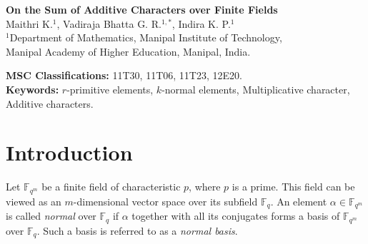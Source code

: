 \documentclass[12pt,a4paper]{article}
\date{}
\theoremstyle{plain}
\theoremstyle{definition}
\numberwithin{equation}{section}
\begin{document}
    \begin{center}
        {\LARGE \textbf{On the Sum of Additive Characters over Finite Fields}}\\
        {\small Maithri K.$^{1}$, Vadiraja Bhatta G. R.$^{1,*}$, Indira K. P.$^{1}$ \\
        $^{1}$Department of Mathematics, Manipal Institute of Technology, \\
        Manipal Academy of Higher Education, Manipal, India.}
    \end{center}
    \begin{abstract}
        In this paper, we study the sum of additive characters over finite fields, with a focus on those of specified $\mathbb{F}_q$-Order. We establish a general formula for these character sums, providing an additive analogue to classical results previously known for multiplicative characters. As an application, we derive a M\"obius function $\mu(g)$ for polynomials $g \in \mathbb{F}_q[x]$, analogous to the integer M\"obius function $\mu(n)$, and develop a characteristic function for $k$-normal elements. We also generalize several classical identities from the integer setting to the polynomial setting, highlighting the structural parallels between these two domains.
    \end{abstract}
    \textbf{MSC Classifications:} 11T30, 11T06, 11T23, 12E20.\\
    \textbf{Keywords:} $r$-primitive elements, $k$-normal elements, Multiplicative character, Additive characters.
    \section{Introduction}

    Let $\mathbb{F}_{q^m}$ be a finite field of characteristic $p$, where $p$ is a prime. This field can be viewed as an $m$-dimensional vector space over its subfield $\mathbb{F}_q$. An element $\alpha \in \mathbb{F}_{q^m}$ is called \emph{normal} over $\mathbb{F}_q$ if $\alpha$ together with all its conjugates forms a basis of $\mathbb{F}_{q^m}$ over $\mathbb{F}_q$. Such a basis is referred to as a \emph{normal basis}.
\end{document}
